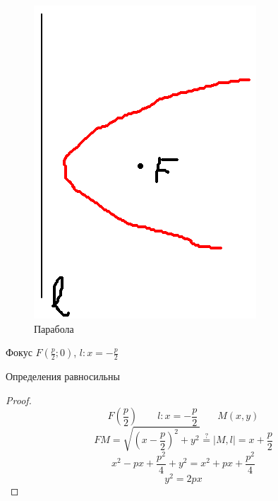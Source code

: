 \begin{figure}[h]
    \centering
    \includegraphics[scale=0.5]{4}
    \caption{Парабола}
\end{figure}

Фокус $F (\frac{p}2; 0) $, $ l : x = - \frac{p}2 $

\begin{theorem}
	Определения равносильны
\end{theorem}

\begin{proof}
    $$ F(\frac{p}2) \qquad l: x = - \frac{p}2 \qquad M (x, y) $$
    $$ FM = \sqrt{(x - \frac{p}2)^2 + y^2} \stackrel?= |M, l| = x + \frac{p}2 $$
    $$ x^2 - px + \frac{p^2}4 + y^2 = x^2 + px + \frac{p^2}4 $$
    $$ y^2 = 2px $$
\end{proof}
